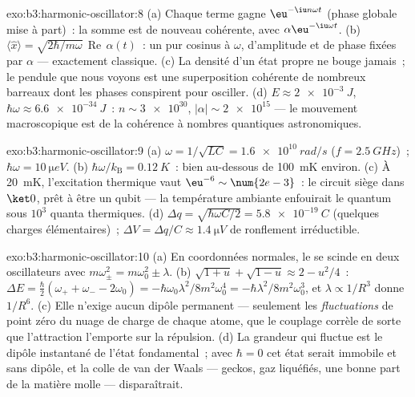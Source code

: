 \begin{solution}{exo:b3:harmonic-oscillator:8}
(a) Chaque terme gagne $\eu^{-\iu n\omega t}$ (phase globale mise à
part)~: la somme est de nouveau cohérente, avec
$\alpha\eu^{-\iu\omega t}$. (b) $\langle\hat x\rangle = \sqrt{2\hbar/m\omega}\,
\operatorname{Re}\,\alpha(t)$~: un pur cosinus à $\omega$, d'amplitude
et de phase fixées par $\alpha$ --- exactement classique. (c) La
densité d'un état propre ne bouge jamais~; le pendule que nous voyons
est une superposition cohérente de nombreux barreaux dont les phases
conspirent pour osciller. (d) $E
\approx \qty{2e-3}{J}$, $\hbar\omega \approx \qty{6.6e-34}{J}$~: $n
\sim \num{3e30}$, $|\alpha| \sim \num{2e15}$ --- le mouvement
macroscopique est de la cohérence à nombres quantiques astronomiques.
\end{solution}

\begin{solution}{exo:b3:harmonic-oscillator:9}
(a) $\omega = 1/\sqrt{LC} = \qty{1.6e10}{rad/s}$ ($f =
\qty{2.5}{GHz}$)~; $\hbar\omega = \qty{10}{\micro eV}$. (b)
$\hbar\omega/k_{\text{B}} = \qty{0.12}{K}$~: bien au-dessous de
\qty{100}{mK} environ. (c) À \qty{20}{mK}, l'excitation thermique vaut
$\eu^{-6} \sim \num{2e-3}$~: le circuit siège dans $\ket0$, prêt à
être un qubit --- la température ambiante enfouirait le quantum sous
$10^3$ quanta thermiques. (d) $\Delta q = \sqrt{\hbar\omega C/2} =
\qty{5.8e-19}{C}$ (quelques charges élémentaires)~; $\Delta V = \Delta q/C
\approx \qty{1.4}{\micro V}$ de ronflement irréductible.
\end{solution}

\begin{solution}{exo:b3:harmonic-oscillator:10}
(a) En coordonnées normales, le  se scinde en deux
oscillateurs avec $m\omega_\pm^2 = m\omega_0^2 \pm \lambda$. (b)
$\sqrt{1 + u} + \sqrt{1 - u} \approx 2 - u^2/4$~: $\Delta E =
\tfrac\hbar2(\omega_+ + \omega_- - 2\omega_0) =
-\hbar\omega_0\lambda^2/8m^2\omega_0^4 =
-\hbar\lambda^2/8m^2\omega_0^3$, et $\lambda \propto 1/R^3$ donne
$1/R^6$. (c) Elle n'exige aucun dipôle permanent --- seulement les
\emph{fluctuations} de point zéro du nuage de charge de chaque atome,
que le couplage corrèle de sorte que l'attraction l'emporte sur la
répulsion. (d) La grandeur qui fluctue est le dipôle instantané de
l'état fondamental~; avec $\hbar = 0$ cet état serait immobile et sans
dipôle, et la colle de van der Waals --- geckos, gaz liquéfiés, une
bonne part de la matière molle --- disparaîtrait.
\end{solution}

